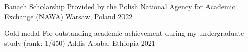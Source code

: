 



\begin{cvhonors}

  \cvhonor
    {Banach Scholarship} %
    {Provided by the Polish National Agency for Academic Exchange (NAWA)} %
    {Warsaw, Poland} %
    {2022} %

  \cvhonor
    {Gold medal} %
    {For outstanding academic achievement during my undergraduate study (rank: 1/450)} %
    {Addis Ababa, Ethiopia} %
    {2021} %
    
\end{cvhonors}
